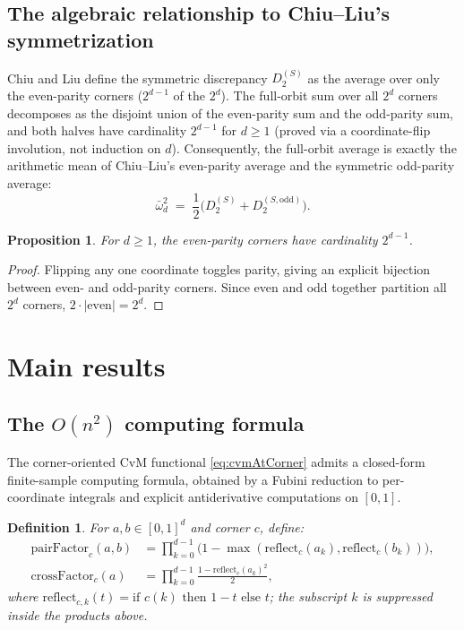 \documentclass[pdflatex]{sn-jnl}
\theoremstyle{thmstyleone}
\newtheorem{proposition}[theorem]{Proposition}
\theoremstyle{thmstyletwo}
\theoremstyle{thmstylethree}
\newtheorem{definition}{Definition}[section]
\begin{document}
\subsection{The algebraic relationship to Chiu--Liu's symmetrization}\label{sec:chiu-liu}

Chiu and Liu \cite{ChiuLiu2009} define the symmetric discrepancy $D_2^{(S)}$ as the average over only the even-parity corners ($2^{d-1}$ of the $2^d$). The full-orbit sum over all $2^d$ corners decomposes as the disjoint union of the even-parity sum and the odd-parity sum, and both halves have cardinality $2^{d-1}$ for $d\ge 1$ (proved via a coordinate-flip involution, not induction on $d$). Consequently, the full-orbit average is exactly the arithmetic mean of Chiu--Liu's even-parity average and the symmetric odd-parity average:
\[
  \bar\omega^2_d \;=\; \frac{1}{2}\bigl(D_2^{(S)} + D_2^{(S,\mathrm{odd})}\bigr).
\]

\begin{proposition}\label{prop:card-even}
For $d\ge 1$, the even-parity corners have cardinality $2^{d-1}$.
\end{proposition}

\begin{proof}
Flipping any one coordinate toggles parity, giving an explicit bijection between even- and odd-parity corners. Since even and odd together partition all $2^d$ corners, $2\cdot|\text{even}| = 2^d$.
\end{proof}

\section{Main results}\label{sec:results}

\subsection{The \texorpdfstring{$O(n^2)$}{O(n-squared)} computing formula}\label{sec:computing}

The corner-oriented CvM functional \eqref{eq:cvmAtCorner} admits a closed-form finite-sample computing formula, obtained by a Fubini reduction to per-coordinate integrals and explicit antiderivative computations on $[0,1]$.

\begin{definition}\label{def:factors}
For $a,b\in[0,1]^d$ and corner $c$, define:
\begin{align}
  \mathrm{pairFactor}_c(a,b) &= \prod_{k=0}^{d-1}\bigl(1-\max(\mathrm{reflect}_c(a_k),\mathrm{reflect}_c(b_k))\bigr),\\
  \mathrm{crossFactor}_c(a) &= \prod_{k=0}^{d-1}\frac{1-\mathrm{reflect}_c(a_k)^2}{2},
\end{align}
where $\mathrm{reflect}_{c,k}(t) = \text{if } c(k) \text{ then } 1-t \text{ else } t$; the subscript $k$ is suppressed inside the products above.
\end{definition}
\end{document}
